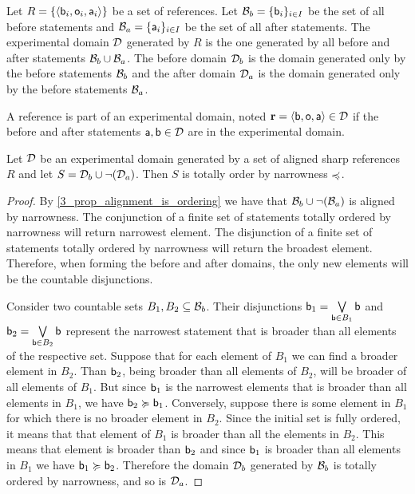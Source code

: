 \documentclass[11pt,letterpaper,fleqn]{memoir} %
\begin{document}
 \begin{mathSection}
 	\begin{defn}
 		Let $R = \{\langle \stmt[b]_i, \stmt[o]_i, \stmt[a]_i \rangle\}$ be a set of references. Let $\basis_b = \{\stmt[b]_i\}_{i \in I}$ be the set of all before statements and $\basis_a = \{\stmt[a]_i\}_{i \in I}$ be the set of all after statements. The experimental domain $\edomain$ generated by $R$ is the one generated by all before and after statements $\basis_b \cup \basis_a$. The before domain $\edomain_b$ is the domain generated only by the before statements $\basis_b$ and the after domain $\edomain_a$ is the domain generated only by the before statements $\basis_a$.
 	\end{defn}
 \begin{defn}
 	A reference is part of an experimental domain, noted $\refStmt = \langle \stmt[b], \stmt[o], \stmt[a] \rangle \in \edomain$ if the before and after statements $\stmt[a], \stmt[b] \in \edomain$ are in the experimental domain.
 \end{defn}
\begin{prop}\label{prop_2_before_statement_ordering}
	Let $\edomain$ be an experimental domain generated by a set of aligned sharp references $R$ and let $S=\edomain_b \cup \NOT (\edomain_a)$. Then $S$ is totally order by narrowness $\narrower$.
\end{prop}
\begin{proof}
	By \ref{3_prop_alignment_is_ordering} we have that $\basis_b \cup \NOT(\basis_a)$ is aligned by narrowness. The conjunction of a finite set of statements totally ordered by narrowness will return narrowest element. The disjunction of a finite set of statements totally ordered by narrowness will return the broadest element. Therefore, when forming the before and after domains, the only new elements will be the countable disjunctions.
	
	Consider two countable sets $B_1, B_2 \subseteq \basis_b$. Their disjunctions $\stmt[b]_1 = \bigOR\limits_{\stmt[b] \in B_1} \stmt[b]$ and $\stmt[b]_2 = \bigOR\limits_{\stmt[b] \in B_2} \stmt[b]$ represent the narrowest statement that is broader than all elements of the respective set. Suppose that for each element of $B_1$ we can find a broader element in $B_2$. Than $\stmt[b]_2$, being broader than all elements of $B_2$, will be broader of all elements of $B_1$. But since $\stmt[b]_1$ is the narrowest elements that is broader than all elements in $B_1$, we have $\stmt[b]_2 \broader \stmt[b]_1$. Conversely, suppose there is some element in $B_1$ for which there is no broader element in $B_2$. Since the initial set is fully ordered, it means that that element of $B_1$ is broader than all the elements in $B_2$. This means that element is broader than $\stmt[b]_2$ and since $\stmt[b]_1$ is broader than all elements in $B_1$ we have $\stmt[b]_1 \broader \stmt[b]_2$. Therefore the domain $\edomain_b$ generated by $\basis_b$ is totally ordered by narrowness, and so is $\edomain_a$.
	

\end{proof}
\end{mathSection}
\end{document}
